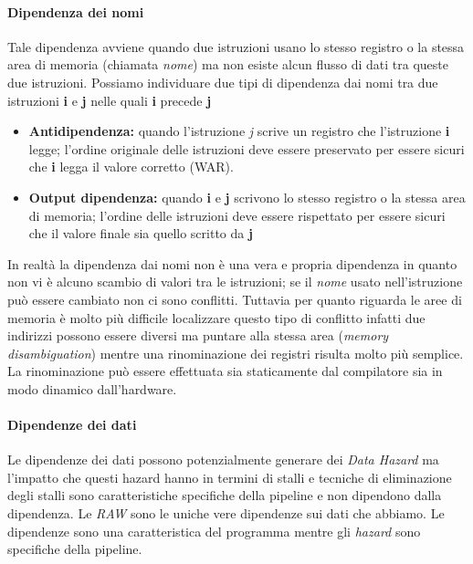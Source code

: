 \paragraph{Dipendenza dei nomi}
Tale dipendenza avviene quando due istruzioni usano lo stesso registro o la stessa area di memoria (chiamata \emph{nome}) ma non esiste alcun flusso di dati tra queste due istruzioni. Possiamo individuare due tipi di dipendenza dai nomi tra due istruzioni \textbf{i} e \textbf{j} nelle quali \textbf{i} precede \textbf{j}
\begin{itemize}
\item \textbf{Antidipendenza:} quando l'istruzione \emph{j} scrive un registro che l'istruzione \textbf{i} legge; l'ordine originale delle istruzioni deve essere preservato per essere sicuri che \textbf{i} legga il valore corretto (WAR).
\item \textbf{Output dipendenza:} quando \textbf{i} e \textbf{j} scrivono lo stesso registro o la stessa area di memoria; l'ordine delle istruzioni deve essere rispettato per essere sicuri che il valore finale sia quello scritto da \textbf{j}
\end{itemize}
In realtà la dipendenza dai nomi non è una vera e propria dipendenza in quanto non vi è alcuno scambio di valori tra le istruzioni; se il \emph{nome} usato nell'istruzione può essere cambiato non ci sono conflitti. Tuttavia per quanto riguarda le aree di memoria è molto più difficile localizzare questo tipo di conflitto infatti due indirizzi possono essere diversi ma puntare alla stessa area (\emph{memory disambiguation}) mentre una rinominazione dei registri risulta molto più semplice.
La rinominazione può essere effettuata sia staticamente dal compilatore sia in modo dinamico dall'hardware.
\paragraph{Dipendenze dei dati}
Le dipendenze dei dati possono potenzialmente generare dei \emph{Data Hazard} ma l'impatto che questi hazard hanno in termini di stalli e tecniche di eliminazione degli stalli sono caratteristiche specifiche della pipeline e non dipendono dalla dipendenza.
Le \emph{RAW} sono le uniche vere dipendenze sui dati che abbiamo.
Le dipendenze sono una caratteristica del programma mentre gli \emph{hazard} sono specifiche della pipeline.
